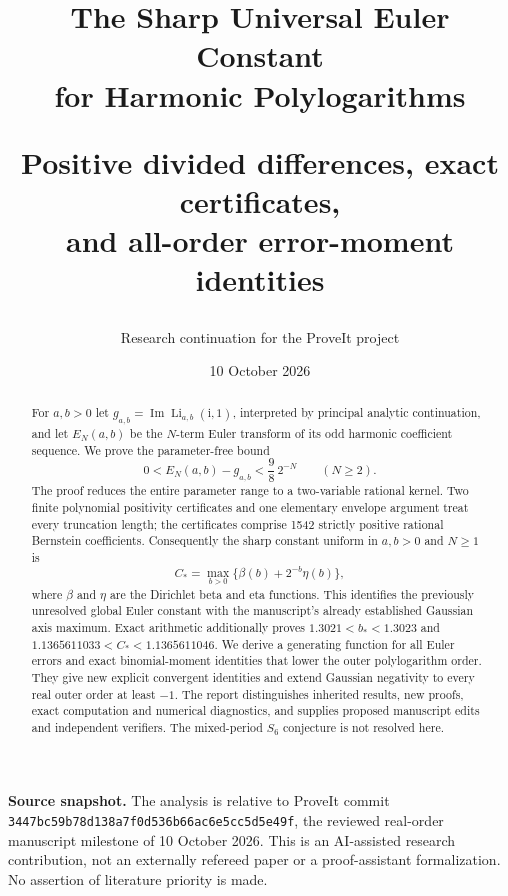 \documentclass[11pt]{article}
\title{The Sharp Universal Euler Constant\texorpdfstring{\\}{: }for Harmonic Polylogarithms\large\par\vspace{7pt}Positive divided differences, exact certificates,\texorpdfstring{\\}{ }and all-order error-moment identities}
\author{Research continuation for the ProveIt project}
\date{10 October 2026}
\numberwithin{equation}{section}
\theoremstyle{definition}
\theoremstyle{remark}
\DeclareMathOperator{\Li}{Li}
\DeclareMathOperator{\Imag}{Im}
\newcommand{\ii}{\mathrm i}
\newcommand{\Cs}{C_*}
\newcommand{\src}[1]{\texttt{\small\nolinkurl{#1}}}
\begin{document}
\maketitle
\begin{abstract}
For $a,b>0$ let $g_{a,b}=\Imag\Li_{a,b}(\ii,1)$, interpreted by principal analytic continuation, and let $E_N(a,b)$ be the $N$-term Euler transform of its odd harmonic coefficient sequence. We prove the parameter-free bound
\[
0<E_N(a,b)-g_{a,b}<\frac98\,2^{-N}\qquad(N\ge2).
\]
The proof reduces the entire parameter range to a two-variable rational kernel. Two finite polynomial positivity certificates and one elementary envelope argument treat every truncation length; the certificates comprise 1542 strictly positive rational Bernstein coefficients.
Consequently the sharp constant uniform in $a,b>0$ and $N\ge1$ is
\[
\Cs=\max_{b>0}\{\beta(b)+2^{-b}\eta(b)\},
\]
where $\beta$ and $\eta$ are the Dirichlet beta and eta functions. This identifies the previously unresolved global Euler constant with the manuscript's already established Gaussian axis maximum. Exact arithmetic additionally proves
$1.3021<b_*<1.3023$ and
$1.1365611033<\Cs<1.1365611046$.
We derive a generating function for all Euler errors and exact binomial-moment identities that lower the outer polylogarithm order. They give new explicit convergent identities and extend Gaussian negativity to every real outer order at least $-1$. The report distinguishes inherited results, new proofs, exact computation and numerical diagnostics, and supplies proposed manuscript edits and independent verifiers. The mixed-period $S_6$ conjecture is not resolved here.
\end{abstract}
\vfill
\noindent\small\textbf{Source snapshot.} The analysis is relative to ProveIt commit
\src{3447bc59b78d138a7f0d536b66ac6e5cc5d5e49f}, the reviewed real-order manuscript milestone of 10 October 2026. This is an AI-assisted research contribution, not an externally refereed paper or a proof-assistant formalization. No assertion of literature priority is made.
\normalsize
\newpage
{\small\setlength{\parskip}{0pt}\tableofcontents}
\newpage








\appendix


\end{document}

